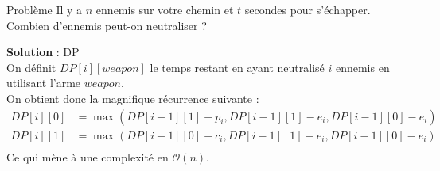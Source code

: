 \begin{frame}
    \frametitle{\problemtitle}
        \begin{block}
            {Problème} Il y a $n$ ennemis sur votre chemin et $t$ secondes pour s'échapper. Combien d'ennemis peut-on neutraliser ?
        \end{block}
        \pause
        \textbf{Solution} : DP \\
        \pause
        On définit $DP[i][weapon]$ le temps restant en ayant neutralisé $i$ ennemis en utilisant l'arme $weapon$.\\
        \pause
        On obtient donc la magnifique récurrence suivante :\\
        \begin{align*}
            DP[i][0] &= \max(DP[i-1][1] - p_i, DP[i-1][1] - e_i, DP[i-1][0] - e_i)\\
            DP[i][1] &= \max(DP[i-1][0] - c_i, DP[i-1][1] - e_i, DP[i-1][0] - e_i)\\
        \end{align*}
        Ce qui mène à une complexité en $\mathcal O(n)$.
        \pause\solvestats
\end{frame}
